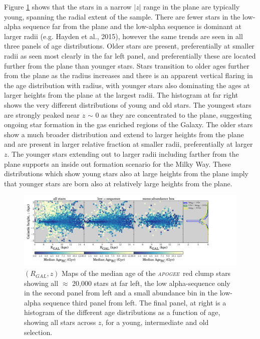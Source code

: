 \documentclass[12pt, preprint]{aastex}
\newcommand{\project}[1]{\textsl{#1}}
\newcommand{\apogee}{\project{\textsc{apogee}}}
\begin{document}
Figure \ref{fig:redclump_age} shows that the stars in a narrow $|z|$ range in the plane are typically young, spanning the radial extent of the sample. There are fewer stars in the low-alpha sequence far from the plane and the low-alpha sequence is dominant at larger radii (e.g. Hayden et al., 2015), however the same trends are seen in all three panels of age distributions. Older stars are present, preferentially at smaller radii as seen most clearly in the far left panel, and preferentially these are located further from the plane than younger stars. Stars transition to older ages further from the plane as the radius increases and there is an apparent vertical flaring in the age distribution with radius, with younger stars also dominating the ages at larger heights from the plane at the largest radii. The histogram at far right shows the very different distributions of young and old stars. The youngest stars are strongly peaked near $z$ $\sim$ 0 as they are concentrated to the plane, suggesting ongoing star formation in the gas enriched regions of the Galaxy. The older stars show a much broader distribution and extend to larger heights from the plane and are present in larger relative fraction at smaller radii, preferentially at larger $z$.  The younger stars extending out to larger radii including farther from the plane supports an inside out formation scenario for the Milky Way. These distributions which show young stars also at large heights from the plane imply that younger stars are born also at relatively large heights from the plane. %

\begin{figure}[p]
\centering
        \includegraphics[scale=0.43]{./plots/agealphamap_hist.pdf}
    \caption{$(R_{GAL},z)$ Maps of the median age of the  \apogee\ red clump stars showing all $\approx$ 20,000 stars at far left, the low alpha-sequence only in the second panel from left and a small abundance bin in the low-alpha sequence third panel from left. The final panel, at right is a histogram of the different age distributions as a function of age, showing all stars across $z$, for a young, intermediate and old selection.  }
\label{fig:redclump_age}
\end{figure}
\end{document}
